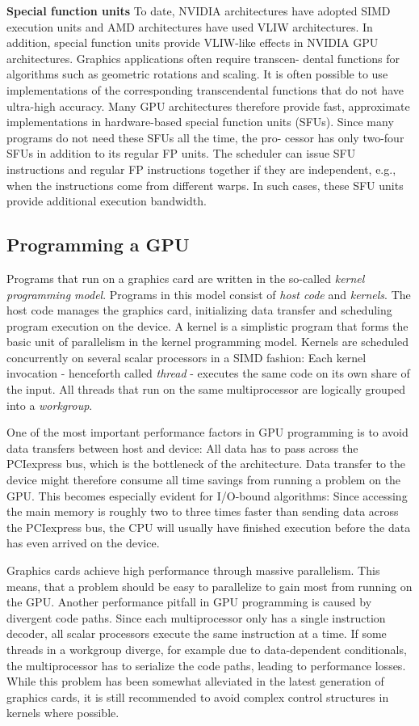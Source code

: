 \documentclass[twocolumn]{article}
\begin{document}
\noindent
\textbf{Special function units} 
To date, NVIDIA architectures have adopted SIMD execution units and AMD architectures have used VLIW architectures. In addition, special function units provide VLIW-like effects in NVIDIA GPU architectures. Graphics applications often require transcen- dental functions for algorithms such as geometric rotations and scaling. It is often possible to use implementations of the corresponding transcendental functions that do not have ultra-high accuracy. Many GPU architectures therefore provide fast, approximate implementations in hardware-based special function units (SFUs). Since many programs do not need these SFUs all the time, the pro- cessor has only two-four SFUs in addition to its regular FP units. The scheduler can issue SFU instructions and regular FP instructions together if they are independent, e.g., when the instructions come from different warps. In such cases, these SFU units provide additional execution bandwidth. 

\subsection{Programming a GPU}
Programs that run on a graphics card are written in the so-called \textit{kernel programming model}. 
Programs in this model consist of \textit{host code} and \textit{kernels}. The host code manages the graphics card, initializing data transfer and scheduling program execution on the device. A kernel is a simplistic program that forms the basic unit of parallelism in the kernel programming model. Kernels are scheduled concurrently on several scalar processors in a SIMD fashion: Each kernel invocation - henceforth called \textit{thread} - executes the same code on its own share of the input. All threads that run on the same multiprocessor are logically grouped into a \textit{workgroup}.

One of the most important performance factors in GPU programming is to avoid data transfers between host and device: All data has to pass across the PCIexpress bus, which is the bottleneck of the architecture. Data transfer to the device might therefore consume all time savings from running a problem on the GPU. This becomes especially evident for I/O-bound algorithms: Since accessing the main memory is roughly two to three times faster than sending data across the PCIexpress bus, the CPU will usually have finished execution before the data has even arrived on the device.

Graphics cards achieve high performance through massive parallelism. This means, that a problem should be easy to parallelize to gain most from running on the GPU. Another performance pitfall in GPU programming is caused by divergent code paths. Since each multiprocessor only has a single instruction decoder, all scalar processors execute the same instruction at a time. If some threads in a workgroup diverge, for example due to data-dependent conditionals, the multiprocessor has to serialize the code paths, leading to performance losses. While this problem has been somewhat alleviated in the latest generation of graphics cards, it is still recommended to avoid complex control structures in kernels where possible.
\end{document}
